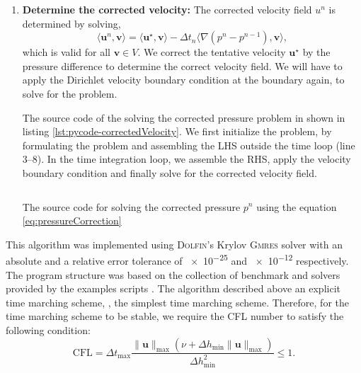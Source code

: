 \begin{enumerate}
	\item \textbf{Determine the corrected velocity:} The corrected velocity field $u^n$ is determined by solving,
		\begin{equation}
		\langle \mathbf{u}^n, \mathbf{v}\rangle = \langle \mathbf{u}^{\star},\mathbf{v} \rangle - \Delta t_n \langle \nabla(p^n - p^{n-1}),\mathbf{v} \rangle,
		\end{equation}
	which is valid for all $\mathbf{v} \in V$. We correct the tentative velocity $\mathbf{u}^{\star}$ by the pressure difference to determine the correct velocity field. We will have to apply the Dirichlet velocity boundary condition at the boundary again, to solve for the problem.
	
	The source code of the solving the corrected pressure problem in shown in listing \ref{lst:pycode-correctedVelocity}. We first initialize the problem, by formulating the problem and assembling the LHS outside the time loop (line \numrange{3}{8}). In the time integration loop, we assemble the RHS, apply the velocity boundary condition and finally solve for the corrected velocity field.
	
		\begin{listing}[p]
		\inputminted[fontseries=courier,obeytabs,fontsize=\scriptsize,mathescape,linenos,numbersep=5pt,frame=lines,framesep=2mm,xleftmargin=20mm,xrightmargin=20mm]{python}{figures/eulerian/correctedVelocity.py}
		\caption{The source code for solving the corrected pressure $p^n$ using the equation \ref{eq:pressureCorrection}}
		\label{lst:pycode-correctedVelocity}
		\end{listing}
		
	\end{enumerate}
	
This algorithm was implemented using \textsc{Dolfin}'s Krylov \textsc{Gmres} solver with an absolute and a relative error tolerance of \num{e-25} and \num{e-12} respectively. The program structure was based on the collection of benchmark and solvers provided by the \fenics examples scripts \cite{nsbench}. The algorithm described above an explicit time marching scheme, , the simplest time marching scheme. Therefore, for the time marching scheme to be stable, we require the CFL number to satisfy the following condition:
	\begin{equation}
	\mathrm{CFL} = \Delta t_{\mathrm{max}} \frac{\lVert\mathbf{u}\rVert_{\mathrm{max}}(\nu +  \Delta h_{\mathrm{min}}\lVert\mathbf{u}\rVert_{\mathrm{max}})}{\Delta h_{\mathrm{min}}^2} \leqslant 1.
	\label{eq:cfl}
	\end{equation}
	
